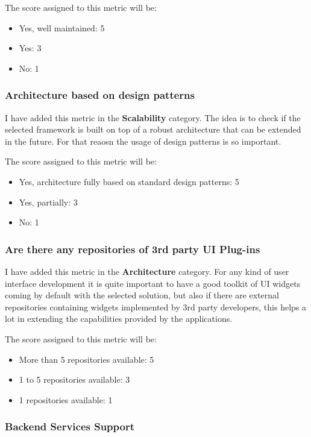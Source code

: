 \documentclass[a4paper,12pt]{book}
\begin{document}
The score assigned to this metric will be:
\begin{itemize}
 \item Yes, well maintained: 5
 \item Yes: 3
 \item No: 1
\end{itemize}

\subsubsection{Architecture based on design patterns}
\label{Architecture based on design patterns}

I have added this metric in the \textbf{Scalability} category. The idea is to check if the selected framework is built on top of a robust architecture that can be extended in the future. For that reaosn the usage of design patterns is so important.

The score assigned to this metric will be:
\begin{itemize}
 \item Yes, architecture fully based on standard design patterns: 5
 \item Yes, partially: 3
 \item No: 1
\end{itemize}

\subsubsection{Are there any repositories of 3rd party UI Plug-ins}
\label{Are there any repositories of 3rd party UI Plug-ins}

I have added this metric in the \textbf{Architecture} category. For any kind of user interface development it is quite important to have a good toolkit of UI widgets coming by default with the selected solution, but also if there are external repositories containing widgets implemented by 3rd party developers, this helps a lot in extending the capabilities provided by the applications.

The score assigned to this metric will be:
\begin{itemize}
 \item More than 5 repositories available: 5
 \item 1 to 5 repositories available: 3
 \item 1 repositories available: 1
\end{itemize}

\subsubsection{Backend Services Support}
\label{Backend Services Support}
\end{document}
